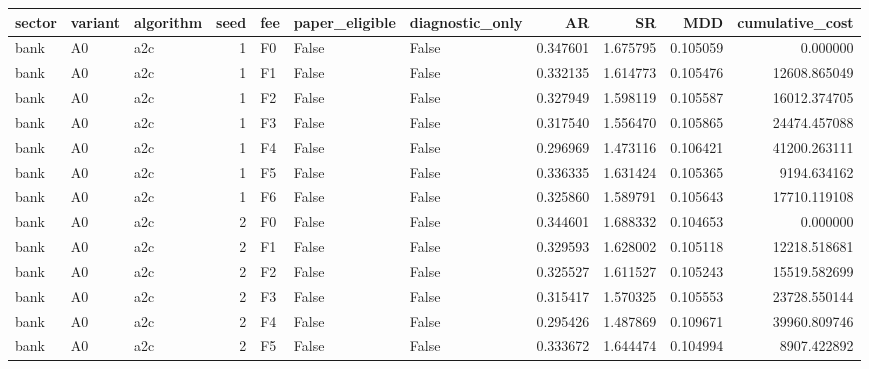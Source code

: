 \begin{tabular}{lllrlllrrrr}
\toprule
    sector & variant & algorithm &  seed & fee &  paper\_eligible &  diagnostic\_only &        AR &        SR &      MDD &  cumulative\_cost \\
\midrule
      bank &      A0 &       a2c &     1 &  F0 &           False &            False &  0.347601 &  1.675795 & 0.105059 &         0.000000 \\
      bank &      A0 &       a2c &     1 &  F1 &           False &            False &  0.332135 &  1.614773 & 0.105476 &     12608.865049 \\
      bank &      A0 &       a2c &     1 &  F2 &           False &            False &  0.327949 &  1.598119 & 0.105587 &     16012.374705 \\
      bank &      A0 &       a2c &     1 &  F3 &           False &            False &  0.317540 &  1.556470 & 0.105865 &     24474.457088 \\
      bank &      A0 &       a2c &     1 &  F4 &           False &            False &  0.296969 &  1.473116 & 0.106421 &     41200.263111 \\
      bank &      A0 &       a2c &     1 &  F5 &           False &            False &  0.336335 &  1.631424 & 0.105365 &      9194.634162 \\
      bank &      A0 &       a2c &     1 &  F6 &           False &            False &  0.325860 &  1.589791 & 0.105643 &     17710.119108 \\
      bank &      A0 &       a2c &     2 &  F0 &           False &            False &  0.344601 &  1.688332 & 0.104653 &         0.000000 \\
      bank &      A0 &       a2c &     2 &  F1 &           False &            False &  0.329593 &  1.628002 & 0.105118 &     12218.518681 \\
      bank &      A0 &       a2c &     2 &  F2 &           False &            False &  0.325527 &  1.611527 & 0.105243 &     15519.582699 \\
      bank &      A0 &       a2c &     2 &  F3 &           False &            False &  0.315417 &  1.570325 & 0.105553 &     23728.550144 \\
      bank &      A0 &       a2c &     2 &  F4 &           False &            False &  0.295426 &  1.487869 & 0.109671 &     39960.809746 \\
      bank &      A0 &       a2c &     2 &  F5 &           False &            False &  0.333672 &  1.644474 & 0.104994 &      8907.422892 \\

\end{tabular}
